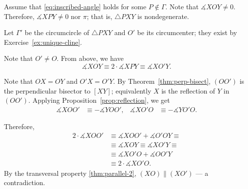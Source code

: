 Assume that \ref{eq:inscribed-angle} holds for some $P\notin \Gamma$.
Note that $\measuredangle X O Y\ne 0$. 
Therefore, $\measuredangle X P Y\ne 0$ nor $\pi$;
that is, $\triangle PXY$ is nondegenerate.

Let $\Gamma'$ be the circumcircle of $\triangle PXY$
and $O'$ be its circumcenter;
they exist by Exercise~\ref{ex:unique-cline}.


Note that $O'\ne O$.
From above, we have 
$$\measuredangle X O Y\equiv 2\cdot\measuredangle X P Y\equiv \measuredangle X O' Y.$$

Note that $OX=OY$ and $O'X=O'Y$.
By Theorem~\ref{thm:perp-bisect},
$(OO')$ is the perpendicular bisector to $[XY]$;
equivalently $X$ is the reflection of $Y$ in $(OO')$.
Applying Proposition~\ref{prop:reflection}, we get
\begin{align*}
\measuredangle X O O'&\equiv -\measuredangle Y O O',
&
\measuredangle X O' O&\equiv -\measuredangle Y O' O.
\end{align*}

Therefore, 
\begin{align*}
2\cdot \measuredangle X O O'
&\equiv\measuredangle X O O'+\measuredangle O' O Y
\equiv
\\
&\equiv \measuredangle X O Y\equiv \measuredangle X O' Y\equiv
\\
&\equiv\measuredangle X O' O+\measuredangle O O' Y
\\
&\equiv 2\cdot \measuredangle X O' O.
\end{align*}
By the transversal property \ref{thm:parallel-2},
$(X O)\parallel (XO')$ --- a contradiction.
\qeds

